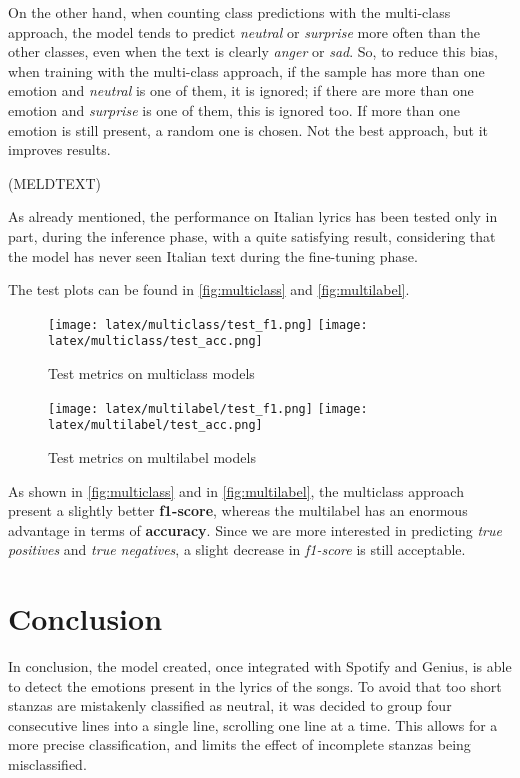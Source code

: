 \documentclass[11pt]{article}
\begin{document}
On the other hand, when counting class predictions with the multi-class approach, the model tends to predict \textit{neutral} or \textit{surprise} more often than the other classes, even when the text is clearly \textit{anger} or \textit{sad}. So, to reduce this bias, when training with the multi-class approach, if the sample has more than one emotion and \textit{neutral} is one of them, it is ignored; if there are more than one emotion and \textit{surprise} is one of them, this is ignored too. If more than one emotion is still present, a random one is chosen. Not the best approach, but it improves results. 

(MELDTEXT)

As already mentioned, the performance on Italian lyrics has been tested only in part, during the inference phase, with a quite satisfying result, considering that the model has never seen Italian text during the fine-tuning phase.


The test plots can be found in \autoref{fig:multiclass} and \autoref{fig:multilabel}.

\begin{figure}[!ht]
    \centering
    \texttt{[image: latex/multiclass/test\_f1.png]}
    \texttt{[image: latex/multiclass/test\_acc.png]}
    \caption{Test metrics on multiclass models}
    \label{fig:multiclass}
\end{figure}

\begin{figure}[!ht]
    \centering
    \texttt{[image: latex/multilabel/test\_f1.png]}
    \texttt{[image: latex/multilabel/test\_acc.png]}
    \caption{Test metrics on multilabel models}
    \label{fig:multilabel}
\end{figure}

As shown in \autoref{fig:multiclass} and in \autoref{fig:multilabel}, the multiclass approach present a slightly better \textbf{f1-score}, whereas the multilabel has an enormous advantage in terms of \textbf{accuracy}. Since we are more interested in predicting \textit{true positives} and \textit{true negatives}, a slight decrease in \textit{f1-score} is still acceptable.

\newpage

\section{Conclusion}

In conclusion, the model created, once integrated with Spotify and Genius, is able to detect the emotions present in the lyrics of the songs. To avoid that too short stanzas are mistakenly classified as neutral, it was decided to group four consecutive lines into a single line, scrolling one line at a time. This allows for a more precise classification, and limits the effect of incomplete stanzas being misclassified. 
\end{document}
